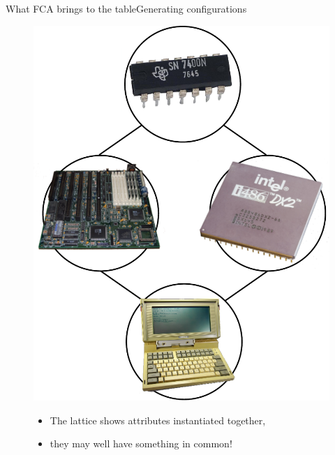 \begin{frame}{What FCA brings to the table}{Generating configurations}
\begin{figure}[ht]
  \begin{minipage}[t]{0.45\linewidth}
    \vspace{0pt}
    \centering
    \includegraphics[width=\textwidth]{img/fca/ressemble2}		
  \end{minipage}
  \hfill
  \begin{minipage}[t]{0.52\linewidth}
    \vspace{0pt}
  \begin{itemize}
    \item The lattice shows attributes instantiated together,
    \item they may well have something in common!
  \end{itemize}
  \end{minipage}
\end{figure}
\end{frame}